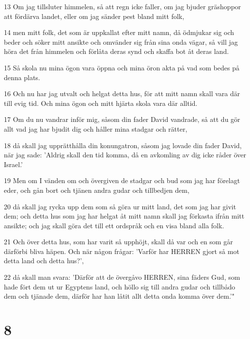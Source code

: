 \par 13 Om jag tillsluter himmelen, så att regn icke faller, om jag bjuder gräshoppor att fördärva landet, eller om jag sänder pest bland mitt folk,
\par 14 men mitt folk, det som är uppkallat efter mitt namn, då ödmjukar sig och beder och söker mitt ansikte och omvänder sig från sina onda vägar, så vill jag höra det från himmelen och förlåta deras synd och skaffa bot åt deras land.
\par 15 Så skola nu mina ögon vara öppna och mina öron akta på vad som bedes på denna plats.
\par 16 Och nu har jag utvalt och helgat detta hus, för att mitt namn skall vara där till evig tid. Och mina ögon och mitt hjärta skola vara där alltid.
\par 17 Om du nu vandrar inför mig, såsom din fader David vandrade, så att du gör allt vad jag har bjudit dig och håller mina stadgar och rätter,
\par 18 då skall jag upprätthålla din konungatron, såsom jag lovade din fader David, när jag sade: 'Aldrig skall den tid komma, då en avkomling av dig icke råder över Israel.'
\par 19 Men om I vänden om och övergiven de stadgar och bud som jag har förelagt eder, och gån bort och tjänen andra gudar och tillbedjen dem,
\par 20 då skall jag rycka upp dem som så göra ur mitt land, det som jag har givit dem; och detta hus som jag har helgat åt mitt namn skall jag förkasta ifrån mitt ansikte; och jag skall göra det till ett ordspråk och en visa bland alla folk.
\par 21 Och över detta hus, som har varit så upphöjt, skall då var och en som går därförbi bliva häpen. Och när någon frågar: 'Varför har HERREN gjort så mot detta land och detta hus?',
\par 22 då skall man svara: 'Därför att de övergåvo HERREN, sina fäders Gud, som hade fört dem ut ur Egyptens land, och höllo sig till andra gudar och tillbådo dem och tjänade dem, därför har han låtit allt detta onda komma över dem.'"

\chapter{8}

